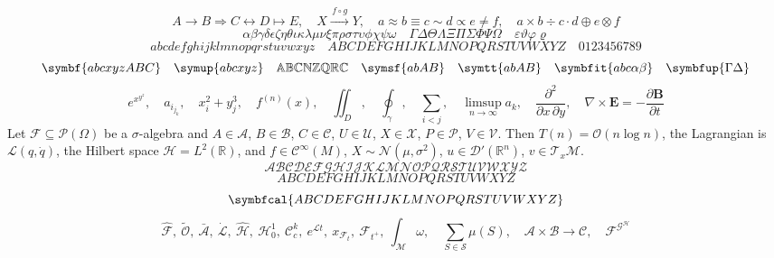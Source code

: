 \documentclass[11pt]{article}
\begin{document}
\[ A\longrightarrow B\Rightarrow C\leftrightarrow D\mapsto E,\quad X\xrightarrow{\,f\circ g\,}Y,\quad
   a\approx b\equiv c\sim d\propto e\ne f,\quad a\times b\div c\cdot d\oplus e\otimes f \]
\[ \alpha\beta\gamma\delta\epsilon\zeta\eta\theta\iota\kappa\lambda\mu\nu\xi\pi\rho\sigma\tau\upsilon\phi\chi\psi\omega\quad
   \Gamma\Delta\Theta\Lambda\Xi\Pi\Sigma\Phi\Psi\Omega\quad \varepsilon\vartheta\varphi\varrho \]
\[ abcdefghijklmnopqrstuvwxyz\quad ABCDEFGHIJKLMNOPQRSTUVWXYZ\quad 0123456789 \]
\[ \symbf{abcxyzABC}\quad \symup{abcxyz}\quad \mathbb{ABCNZQRC}\quad \symsf{abAB}\quad \symtt{abAB}\quad \symbfit{abc\alpha\beta}\quad \symbfup{\Gamma\Delta} \]
\[ e^{x^{y^z}},\quad a_{i_{j_k}},\quad x_i^2+y_j^3,\quad f^{(n)}(x),\quad \iint_D,\quad \oint_\gamma,\quad \sum_{i<j},\quad
   \limsup_{n\to\infty}a_k,\quad \frac{\partial^2}{\partial x\,\partial y},\quad \nabla\times\symbf{E}=-\frac{\partial\symbf{B}}{\partial t} \]
Let $\mathcal{F}\subseteq\mathcal{P}(\Omega)$ be a $\sigma$-algebra and $A\in\mathcal{A}$, $B\in\mathcal{B}$,
$C\in\mathcal{C}$, $U\in\mathcal{U}$, $X\in\mathcal{X}$, $P\in\mathcal{P}$, $V\in\mathcal{V}$. Then
$T(n)=\mathcal{O}(n\log n)$, the Lagrangian is $\mathcal{L}(q,\dot q)$, the Hilbert space
$\mathcal{H}=L^2(\mathbb{R})$, and $f\in\mathcal{C}^\infty(M)$, $X\sim\mathcal{N}(\mu,\sigma^2)$,
$u\in\mathcal{D}'(\mathbb{R}^n)$, $v\in\mathcal{T}_x\mathcal{M}$.
\[ \mathcal{ABCDEFGHIJKLMNOPQRSTUVWXYZ} \]
\[ ABCDEFGHIJKLMNOPQRSTUVWXYZ \]
\[ \symbfcal{ABCDEFGHIJKLMNOPQRSTUVWXYZ} \]
\[ \hat{\mathcal{F}},\ \tilde{\mathcal{O}},\ \bar{\mathcal{A}},\ \dot{\mathcal{L}},\ \hat{\mathcal{H}},\ \mathcal{H}_0^1,\
   \mathcal{C}^k_c,\ e^{\mathcal{L}t},\ x_{\mathcal{F}_t},\ \mathcal{F}_{t^+},\ \int_{\mathcal{M}}\omega,\quad
   \sum_{S\in\mathcal{S}}\mu(S),\quad \mathcal{A}\times\mathcal{B}\to\mathcal{C},\quad \mathcal{F}^{\mathcal{G}^{\mathcal{H}}} \]
\end{document}

